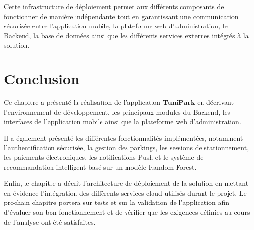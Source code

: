 \par Cette infrastructure de déploiement permet aux différents composants de fonctionner de manière indépendante tout en garantissant une communication sécurisée entre l'application mobile, la plateforme web d'administration, le Backend, la base de données ainsi que les différents services externes intégrés à la solution.
\section{Conclusion}

\par Ce chapitre a présenté la réalisation de l'application \textbf{TuniPark} en décrivant l'environnement de développement, les principaux modules du Backend, les interfaces de l'application mobile ainsi que la plateforme web d'administration.

\par Il a également présenté les différentes fonctionnalités implémentées, notamment l'authentification sécurisée, la gestion des parkings, les sessions de stationnement, les paiements électroniques, les notifications Push et le système de recommandation intelligent basé sur un modèle Random Forest.

\par Enfin, le chapitre a décrit l'architecture de déploiement de la solution en mettant en évidence l'intégration des différents services cloud utilisés durant le projet. Le prochain chapitre portera sur tests et sur la validation de l'application afin d'évaluer son bon fonctionnement et de vérifier que les exigences définies au cours de l'analyse ont été satisfaites.